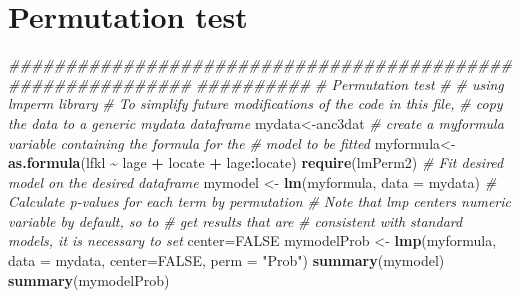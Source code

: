 \documentclass[
  12pt,
]{book}
\newenvironment{Shaded}{\begin{snugshade}}{\end{snugshade}}
\newcommand{\CharTok}[1]{\textcolor[rgb]{0.31,0.60,0.02}{#1}}
\newcommand{\CommentTok}[1]{\textcolor[rgb]{0.56,0.35,0.01}{\textit{#1}}}
\newcommand{\ControlFlowTok}[1]{\textcolor[rgb]{0.13,0.29,0.53}{\textbf{#1}}}
\newcommand{\DataTypeTok}[1]{\textcolor[rgb]{0.13,0.29,0.53}{#1}}
\newcommand{\DecValTok}[1]{\textcolor[rgb]{0.00,0.00,0.81}{#1}}
\newcommand{\KeywordTok}[1]{\textcolor[rgb]{0.13,0.29,0.53}{\textbf{#1}}}
\newcommand{\NormalTok}[1]{#1}
\newcommand{\OperatorTok}[1]{\textcolor[rgb]{0.81,0.36,0.00}{\textbf{#1}}}
\newcommand{\OtherTok}[1]{\textcolor[rgb]{0.56,0.35,0.01}{#1}}
\newcommand{\StringTok}[1]{\textcolor[rgb]{0.31,0.60,0.02}{#1}}
\begin{document}
\begin{Shaded}
\end{Shaded}

\hypertarget{permutation-test}{%
\section{Permutation test}\label{permutation-test}}

\begin{Shaded}
\begin{Highlighting}[]
\CommentTok{\#\#\#\#\#\#\#\#\#\#\#\#\#\#\#\#\#\#\#\#\#\#\#\#\#\#\#\#\#\#\#\#\#\#\#\#\#\#\#\#\#\#\#\#\#\#\#\#\#\#\#\#\#\#\#\#\#\#\#\#}
\CommentTok{\#\#\#\#\#\#\#\#\#\#}
\CommentTok{\# Permutation test}
\CommentTok{\#}
\CommentTok{\# using lmperm library}
\CommentTok{\# To simplify future modifications of the code in this file,}
\CommentTok{\# copy the data to a generic mydata dataframe}
\NormalTok{mydata\textless{}{-}anc3dat}
\CommentTok{\# create a myformula variable containing the formula for the}
\CommentTok{\# model to be fitted}
\NormalTok{myformula\textless{}{-}}\KeywordTok{as.formula}\NormalTok{(lfkl }\OperatorTok{\textasciitilde{}}\StringTok{ }\NormalTok{lage }\OperatorTok{+}\StringTok{ }\NormalTok{locate }\OperatorTok{+}\StringTok{ }\NormalTok{lage}\OperatorTok{:}\NormalTok{locate)}
\KeywordTok{require}\NormalTok{(lmPerm2)}
\CommentTok{\# Fit desired model on the desired dataframe}
\NormalTok{mymodel \textless{}{-}}\StringTok{ }\KeywordTok{lm}\NormalTok{(myformula, }\DataTypeTok{data =}\NormalTok{ mydata)}
\CommentTok{\# Calculate p{-}values for each term by permutation}
\CommentTok{\# Note that lmp centers numeric variable by default, so to}
\CommentTok{\# get results that are}
\CommentTok{\# consistent with standard models, it is necessary to set}
\NormalTok{center=}\OtherTok{FALSE}
\NormalTok{mymodelProb \textless{}{-}}\StringTok{ }\KeywordTok{lmp}\NormalTok{(myformula, }\DataTypeTok{data =}\NormalTok{ mydata, }\DataTypeTok{center=}\OtherTok{FALSE}\NormalTok{,}
\DataTypeTok{perm =} \StringTok{"Prob"}\NormalTok{)}
\KeywordTok{summary}\NormalTok{(mymodel)}
\KeywordTok{summary}\NormalTok{(mymodelProb)}
\end{Highlighting}
\end{Shaded}
\end{document}
